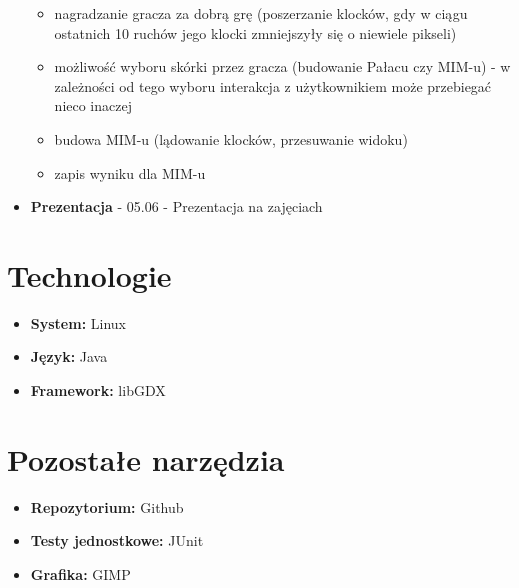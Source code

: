\documentclass{article}
\begin{document}
\begin{itemize}
\begin{itemize}
      \item nagradzanie gracza za dobrą grę (poszerzanie klocków, gdy w ciągu ostatnich 10 ruchów jego klocki zmniejszyły się o niewiele pikseli)
    \item możliwość wyboru skórki przez gracza (budowanie Pałacu czy MIM-u) - w zależności od tego wyboru interakcja z użytkownikiem może przebiegać nieco inaczej
    \item budowa MIM-u (lądowanie klocków, przesuwanie widoku)
    \item zapis wyniku dla MIM-u
    \end{itemize}
    \item\textbf{Prezentacja} - 05.06 - Prezentacja na zajęciach 
\end{itemize}

\section{Technologie}
\begin{itemize}
\item\textbf{System:} Linux
\item\textbf{Język:} Java
\item\textbf{Framework:} libGDX
\end{itemize}


\section{Pozostałe narzędzia}
\begin{itemize}
\item\textbf{Repozytorium:} Github
\item\textbf{Testy jednostkowe:} JUnit
\item\textbf{Grafika:} GIMP
\end{itemize}
\end{document}
